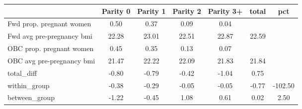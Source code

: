 \begin{tabular}{l*{6}{c}}
\toprule
            &\multicolumn{1}{c}{Parity 0}&\multicolumn{1}{c}{Parity 1}&\multicolumn{1}{c}{Parity 2}&\multicolumn{1}{c}{Parity 3+}&\multicolumn{1}{c}{total}&\multicolumn{1}{c}{pct}\\
\midrule
\midrule
Fwd prop. pregnant women&        0.50&        0.37&        0.09&        0.04&            &            \\
Fwd avg pre-pregnancy bmi&       22.28&       23.01&       22.51&       22.87&       22.59&            \\
OBC prop. pregnant women&        0.45&        0.35&        0.13&        0.07&            &            \\
OBC avg pre-pregnancy bmi&       21.47&       22.22&       22.09&       21.83&       21.84&            \\
total\_diff  &       -0.80&       -0.79&       -0.42&       -1.04&        0.75&            \\
within\_group&       -0.38&       -0.29&       -0.05&       -0.05&       -0.77&     -102.50\\
between\_group&       -1.22&       -0.45&        1.08&        0.61&        0.02&        2.50\\
\bottomrule
\end{tabular}
